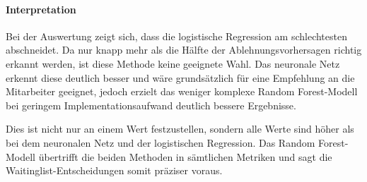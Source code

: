 
\paragraph{Interpretation}
Bei der Auswertung zeigt sich, dass die logistische Regression am schlechtesten abschneidet. Da nur knapp mehr als die Hälfte der Ablehnungsvorhersagen richtig erkannt werden, ist diese Methode keine geeignete Wahl.
Das neuronale Netz erkennt diese deutlich besser und wäre grundsätzlich für eine Empfehlung an die Mitarbeiter geeignet, jedoch erzielt das weniger komplexe Random Forest-Modell bei geringem Implementationsaufwand deutlich bessere Ergebnisse.

Dies ist nicht nur an einem Wert festzustellen, sondern alle Werte sind höher als bei dem neuronalen Netz und der logistischen Regression. 
Das Random Forest-Modell übertrifft die beiden Methoden in sämtlichen Metriken und sagt die Waitinglist-Entscheidungen somit präziser voraus.






